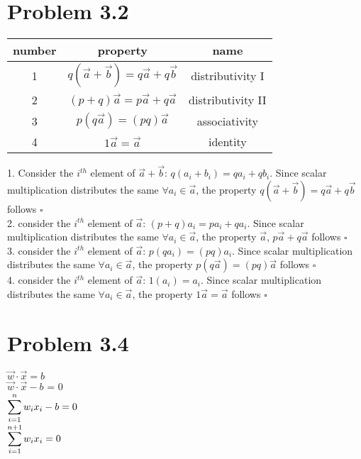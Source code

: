\documentclass{article}
\begin{document}
\pagebreak
\fi

\section{Problem 3.2}
   


\begin{center}
\begin{tabular}{ |c|c|c| } 
\hline
number & property & name \\
\hline
1 & $q(\vec{a}+\vec{b}) = q\vec{a} + q\vec{b}$ & distributivity I \\ 
2 & $(p+q)\vec{a} = p\vec{a} + q\vec{a}$ & distributivity II \\ 
3 & $p(q\vec{a}) = (pq)\vec{a}$ & associativity \\ 
4 & $1\vec{a} = \vec{a}$ & identity \\
\hline
\end{tabular}
\end{center}

1. Consider the $i^{th}$ element of $\vec{a} + \vec{b}$: $q(a_i + b_i) = qa_i + qb_i$. Since scalar multiplication distributes the same $\forall a_i \in \vec{a}$, the property $q(\vec{a}+\vec{b}) = q\vec{a} + q\vec{b}$ follows $\square$ \\

2. consider the $i^{th}$ element of $\vec{a}$: $(p+q)a_i = pa_i + qa_i$. Since scalar multiplication distributes the same $\forall a_i \in \vec{a}$, the property $\vec{a}$, $p\vec{a} + q\vec{a}$ follows $\square$ \\

3. consider the $i^{th}$ element of $\vec{a}$: $p(qa_i) = (pq)a_i$. Since scalar multiplication distributes the same $\forall a_i \in \vec{a}$, the property $p(q\vec{a}) = (pq)\vec{a}$ follows $\square$ \\

4. consider the $i^{th}$ element of $\vec{a}$: $1(a_i) = a_i$.  Since scalar multiplication distributes the same $\forall a_i \in \vec{a}$, the property $1\vec{a} = \vec{a}$ follows $\square$ \\

\section{Problem 3.4}
\begin{center}
 $\vec{w} \cdot \vec{x} = b$ \\
 
 $\vec{w} \cdot \vec{x} - b$ = 0\\
 
 $\smashoperator[r]{\sum_{i=1}^{n}} w_ix_i - b = 0$ \\
 
 $\smashoperator[r]{\sum_{i=1}^{n+1}} w_ix_i = 0 $ \\
 
 
\end{center} 
\end{document}
